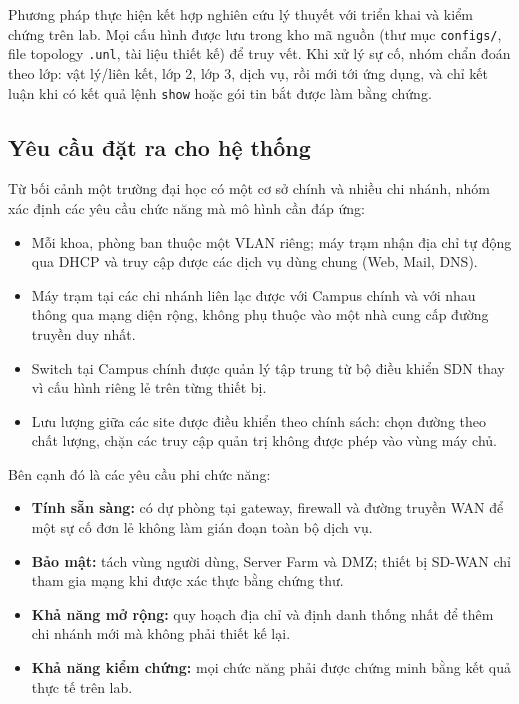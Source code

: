 Phương pháp thực hiện kết hợp nghiên cứu lý thuyết với triển khai và kiểm chứng trên lab. Mọi cấu hình được lưu trong kho mã nguồn (thư mục \texttt{configs/}, file topology \texttt{.unl}, tài liệu thiết kế) để truy vết. Khi xử lý sự cố, nhóm chẩn đoán theo lớp: vật lý/liên kết, lớp 2, lớp 3, dịch vụ, rồi mới tới ứng dụng, và chỉ kết luận khi có kết quả lệnh \texttt{show} hoặc gói tin bắt được làm bằng chứng.

\subsection{Yêu cầu đặt ra cho hệ thống}

Từ bối cảnh một trường đại học có một cơ sở chính và nhiều chi nhánh, nhóm xác định các yêu cầu chức năng mà mô hình cần đáp ứng:

\begin{itemize}
    \item Mỗi khoa, phòng ban thuộc một VLAN riêng; máy trạm nhận địa chỉ tự động qua DHCP và truy cập được các dịch vụ dùng chung (Web, Mail, DNS).
    \item Máy trạm tại các chi nhánh liên lạc được với Campus chính và với nhau thông qua mạng diện rộng, không phụ thuộc vào một nhà cung cấp đường truyền duy nhất.
    \item Switch tại Campus chính được quản lý tập trung từ bộ điều khiển SDN thay vì cấu hình riêng lẻ trên từng thiết bị.
    \item Lưu lượng giữa các site được điều khiển theo chính sách: chọn đường theo chất lượng, chặn các truy cập quản trị không được phép vào vùng máy chủ.
\end{itemize}

Bên cạnh đó là các yêu cầu phi chức năng:

\begin{itemize}
    \item \textbf{Tính sẵn sàng:} có dự phòng tại gateway, firewall và đường truyền WAN để một sự cố đơn lẻ không làm gián đoạn toàn bộ dịch vụ.
    \item \textbf{Bảo mật:} tách vùng người dùng, Server Farm và DMZ; thiết bị SD-WAN chỉ tham gia mạng khi được xác thực bằng chứng thư.
    \item \textbf{Khả năng mở rộng:} quy hoạch địa chỉ và định danh thống nhất để thêm chi nhánh mới mà không phải thiết kế lại.
    \item \textbf{Khả năng kiểm chứng:} mọi chức năng phải được chứng minh bằng kết quả thực tế trên lab.
\end{itemize}

